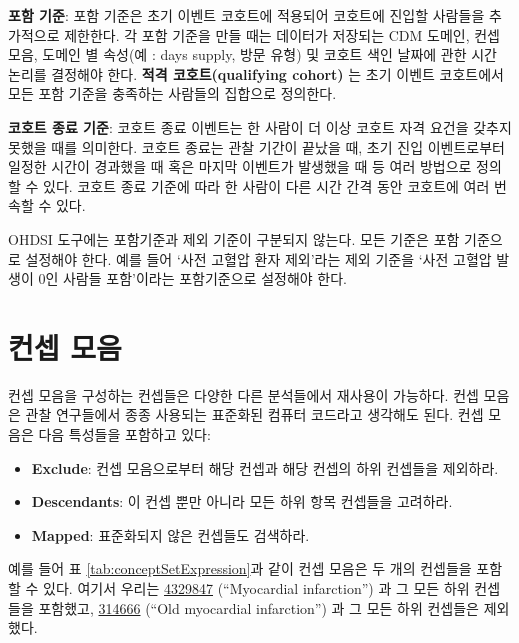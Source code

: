 \documentclass[11pt]{book}
\providecommand{\tightlist}{%
  \setlength{\itemsep}{0pt}\setlength{\parskip}{0pt}}
\theoremstyle{definition}
\theoremstyle{definition}
\theoremstyle{definition}
\theoremstyle{remark}
\let\BeginKnitrBlock\begin \let\EndKnitrBlock\end
\begin{document}
\textbf{포함 기준}: 포함 기준은 초기 이벤트 코호트에 적용되어 코호트에
진입할 사람들을 추가적으로 제한한다. 각 포함 기준을 만들 때는 데이터가
저장되는 CDM 도메인, 컨셉 모음, 도메인 별 속성(예 : days supply, 방문
유형) 및 코호트 색인 날짜에 관한 시간 논리를 결정해야 한다. \textbf{적격
코호트(qualifying cohort)} 는 초기 이벤트 코호트에서 모든 포함 기준을
충족하는 사람들의 집합으로 정의한다. 

\textbf{코호트 종료 기준}: 코호트 종료 이벤트는 한 사람이 더 이상 코호트
자격 요건을 갖추지 못했을 때를 의미한다. 코호트 종료는 관찰 기간이
끝났을 때, 초기 진입 이벤트로부터 일정한 시간이 경과했을 때 혹은 마지막
이벤트가 발생했을 때 등 여러 방법으로 정의할 수 있다. 코호트 종료 기준에
따라 한 사람이 다른 시간 간격 동안 코호트에 여러 번 속할 수
있다.

\BeginKnitrBlock{rmdimportant}
OHDSI 도구에는 포함기준과 제외 기준이 구분되지 않는다. 모든 기준은 포함
기준으로 설정해야 한다. 예를 들어 `사전 고혈압 환자 제외'라는 제외
기준을 `사전 고혈압 발생이 0인 사람들 포함'이라는 포함기준으로 설정해야
한다.
\EndKnitrBlock{rmdimportant}

\section{컨셉 모음}\label{conceptSets}


컨셉 모음을 구성하는 컨셉들은 다양한 다른 분석들에서 재사용이 가능하다.
컨셉 모음은 관찰 연구들에서 종종 사용되는 표준화된 컴퓨터 코드라고
생각해도 된다. 컨셉 모음은 다음 특성들을 포함하고 있다:

\begin{itemize}
\tightlist
\item
  \textbf{Exclude}: 컨셉 모음으로부터 해당 컨셉과 해당 컨셉의 하위
  컨셉들을 제외하라.
\item
  \textbf{Descendants}: 이 컨셉 뿐만 아니라 모든 하위 항목 컨셉들을
  고려하라.
\item
  \textbf{Mapped}: 표준화되지 않은 컨셉들도 검색하라.
\end{itemize}

예를 들어 표 \ref{tab:conceptSetExpression}과 같이 컨셉 모음은 두 개의
컨셉들을 포함할 수 있다. 여기서 우리는
\href{http://athena.ohdsi.org/search-terms/terms/4329847}{4329847}
(``Myocardial infarction'') 과 그 모든 하위 컨셉들을 포함했고,
\href{http://athena.ohdsi.org/search-terms/terms/314666}{314666} (``Old
myocardial infarction'') 과 그 모든 하위 컨셉들은 제외했다.
\end{document}

